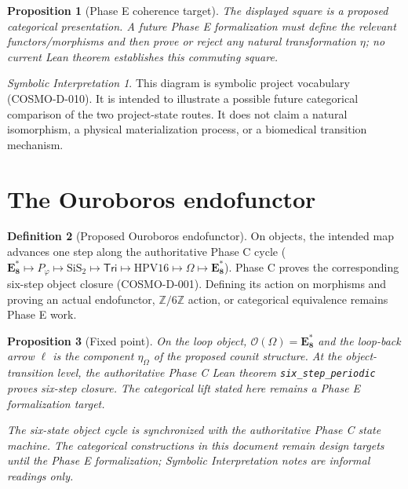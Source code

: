 \documentclass[11pt]{article}
\theoremstyle{definition}
\newtheorem{definition}{Definition}[section]
\theoremstyle{plain}
\newtheorem{proposition}[definition]{Proposition}
\theoremstyle{remark}
\newtheorem*{interp}{Symbolic Interpretation}
\newcommand{\EEs}{\mathbf{E_8^{*}}}
\newcommand{\SiS}{\mathrm{SiS_2}}
\newcommand{\HPV}{\mathrm{HPV16}}
\newcommand{\phigr}{\varphi}
\begin{document}
\begin{proposition}[Phase E coherence target]\label{prop:square}
The displayed square is a proposed categorical presentation. A future Phase E
formalization must define the relevant functors/morphisms and then prove or
reject any natural transformation $\eta$; no current Lean theorem establishes
this commuting square.
\end{proposition}

\begin{interp}
This diagram is symbolic project vocabulary (COSMO-D-010). It is intended to
illustrate a possible future categorical comparison of the two project-state
routes. It does not claim a natural isomorphism, a physical materialization
process, or a biomedical transition mechanism.
\end{interp}

\section{The Ouroboros endofunctor}

\begin{definition}[Proposed Ouroboros endofunctor]
On objects, the intended map advances one step along the authoritative Phase C
cycle ($\EEs\mapsto P_\phigr\mapsto\SiS\mapsto\mathsf{Tri}
\mapsto\HPV\mapsto\Omega\mapsto\EEs$). Phase C proves the corresponding
six-step object closure (COSMO-D-001). Defining its action on morphisms and proving an actual
endofunctor, $\mathbb{Z}/6\mathbb{Z}$ action, or categorical equivalence remains
Phase E work.
\end{definition}

\begin{proposition}[Fixed point]
On the loop object, $\mathcal{O}(\Omega)=\EEs$ and the loop-back arrow $\ell$
is the component $\eta_\Omega$ of the proposed counit structure. At the
object-transition level, the authoritative Phase C Lean theorem
\texttt{six\_step\_periodic} proves six-step closure. The categorical lift
stated here remains a Phase E formalization target.
\end{proposition}

\vfill
\begin{center}\small
\textit{The six-state object cycle is synchronized with the authoritative
Phase C state machine. The categorical constructions in this document remain
design targets until the Phase E formalization; \emph{Symbolic Interpretation}
notes are informal readings only.}
\end{center}
\end{document}
